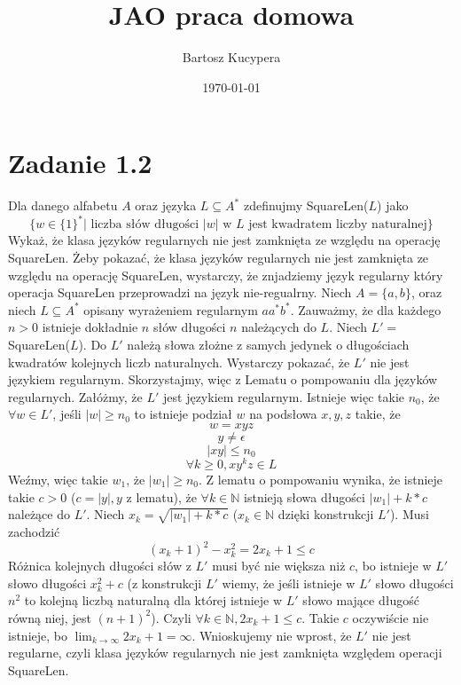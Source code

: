 \documentclass{article}
\title{JAO praca domowa}
\author{Bartosz Kucypera}
\date{\today}
\begin{document}
\maketitle

\section*{Zadanie 1.2} 

Dla danego alfabetu $A$ oraz języka $L \subseteq A^* $ zdefinujmy SquareLen($L$) jako
$$\{w \in \{1\}^* | \mbox{ liczba słów długości } |w| \mbox{ w $L$ jest kwadratem liczby naturalnej} \}$$
Wykaż, że klasa języków regularnych nie jest zamknięta ze względu na operację SquareLen. \newline
\newline
Żeby pokazać, że klasa języków regularnych nie jest zamknięta ze względu na operację SquareLen, wystarczy, że znjadziemy język regularny który operacja SquareLen przeprowadzi na język nie-regualrny.
\newline 
Niech $A = \{a, b\}$, oraz niech $L \subseteq A^*$ opisany wyrażeniem regularnym $aa^*b^*$. \newline
Zauważmy, że dla każdego $n > 0$ istnieje dokładnie $n$ słów długości $n$ należących do $L$. \newline
Niech $L' = $ SquareLen($L$). Do $L'$ należą słowa złożne z samych jedynek o długościach kwadratów kolejnych liczb naturalnych. \newline 
Wystarczy pokazać, że $L'$ nie jest językiem regularnym. Skorzystajmy, więc z Lematu o pompowaniu dla języków regularnych. \newline 
Załóżmy, że $L'$ jest językiem regularnym. Istnieje więc takie $n_0$, że $ \forall w \in L'$, jeśli $|w| \ge n_0$ to istnieje podział $w$ na podsłowa $x, y, z$ takie, że $$w = xyz$$ $$y \neq \epsilon$$ $$|xy| \le n_0$$ $$\forall k \ge 0, xy^kz \in L$$ \newline
Weźmy, więc takie $w_1$, że $|w_1| \ge n_0$. Z lematu o pompowaniu wynika, że istnieje takie $c > 0$ ($c = |y|, y$ z lematu), że $\forall k \in \mathbb{N}$ istnieją słowa długości $|w_1| + k*c$ należące do $L'$. \newline Niech $x_k = \sqrt{|w_1| + k*c}$ ($x_k \in \mathbb{N}$ dzięki konstrukcji $L'$). Musi zachodzić 
$$(x_k+1)^2 - x_k^2 = 2x_k + 1 \le c$$ Różnica kolejnych długości słów z $L'$ musi być nie większa niż $c$, bo istnieje w $L'$ słowo długości $x_k^2 + c$ (z konstrukcji $L'$ wiemy, że jeśli istnieje w $L'$ słowo długości $n^2$ to kolejną liczbą naturalną dla której istnieje w $L'$ słowo mające długość równą niej, jest $(n+1)^2$). Czyli $\forall k \in \mathbb{N}, 2x_k + 1 \le c$. Takie $c$ oczywiście nie istnieje, bo $\lim_{k\to\infty} 2x_k+1 = \infty $. Wnioskujemy nie wprost, że $L'$ nie jest regularne, czyli klasa języków regularnych nie jest zamknięta względem operacji SquareLen.
\end{document}
